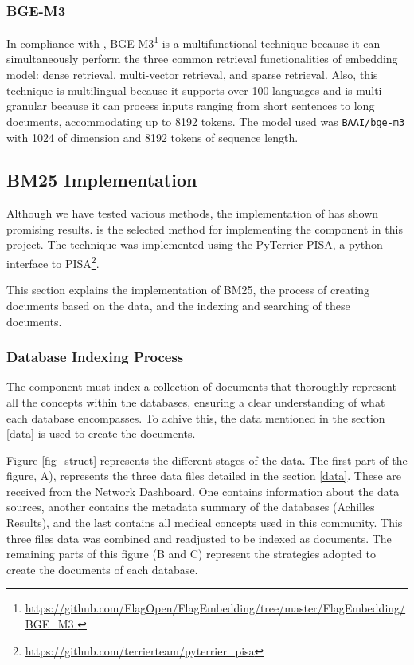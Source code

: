 

\subsubsection{BGE-M3} 

In compliance with \citet{chen_bge_2024}, BGE-M3\footnote{\url{https://github.com/FlagOpen/FlagEmbedding/tree/master/FlagEmbedding/BGE_M3 }} is a multifunctional technique because it can simultaneously perform  the three common retrieval functionalities of embedding model: dense retrieval, multi-vector retrieval, and sparse retrieval. Also, this technique is multilingual because it supports over 100 languages and is multi-granular because it can process inputs ranging from short sentences to long documents, accommodating up to 8192 tokens. The model used was \texttt{BAAI/bge-m3} with 1024 of dimension and 8192 tokens of sequence length.




\subsection{BM25 Implementation}
\label{bm25implementation}

Although we have tested various methods, the implementation of {\bm} has shown promising results. {\bm} is the selected method for implementing the {\ir} component in this project. The technique was implemented using the PyTerrier PISA, a python interface to PISA\footnote{\url{https://github.com/terrierteam/pyterrier_pisa}}.

This section explains the implementation of BM25, the process of creating documents based on the {\ehden} data, and the indexing and searching of these documents.


\subsubsection{Database Indexing Process}

The {\ir} component must index a collection of documents that thoroughly represent all the concepts within the databases, ensuring a clear understanding of what each database encompasses. To achive this, the data mentioned in the section \ref{data} is used to create the documents.

Figure \ref{fig_struct} represents the different stages of the data. The first part of the figure, A), represents the three data files detailed in the section \ref{data}. These are received from the {\ehden} Network Dashboard. One contains information about the data sources, another contains the metadata summary of the databases (Achilles Results), and the last contains all medical concepts used in this community. This three files data was combined and readjusted to be indexed as documents. The remaining parts of this figure (B and C) represent the strategies adopted to create the documents of each database.

